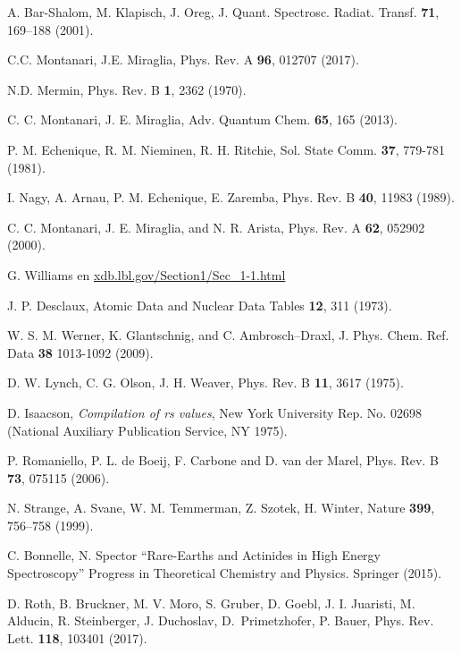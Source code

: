 \begin{thebibliography}{9}
A. Bar-Shalom, M. Klapisch, J. Oreg,
J. Quant. Spectrosc. Radiat. Transf. \textbf{71}, 169--188 (2001).

C.C. Montanari, J.E. Miraglia, 
Phys. Rev. A \textbf{96}, 012707 (2017).

N.D. Mermin, 
Phys. Rev. B \textbf{1}, 2362 (1970).

C. C. Montanari, J. E. Miraglia,
Adv. Quantum Chem. \textbf{65}, 165 (2013).

P. M. Echenique, R. M. Nieminen, R. H. Ritchie, 
Sol. State Comm. \textbf{37}, 779-781 (1981).

I. Nagy, A. Arnau, P. M. Echenique, E. Zaremba, 
Phys. Rev. B \textbf{40}, 11983 (1989).

C. C. Montanari, J. E. Miraglia, and N. R. Arista, 
Phys. Rev. A \textbf{62}, 052902 (2000).

G. Williams en 
\href{http://xdb.lbl.gov/Section1/Sec\_1-1.html}
{xdb.lbl.gov/Section1/Sec\_1-1.html}

J. P. Desclaux,
Atomic Data and Nuclear Data Tables \textbf{12}, 311 (1973).

W. S. M. Werner, K. Glantschnig, and C. Ambrosch--Draxl,
J. Phys. Chem. Ref. Data \textbf{38} 1013-1092 (2009).

D. W. Lynch, C. G. Olson, J. H. Weaver,
Phys. Rev. B \textbf{11}, 3617 (1975).

D. Isaacson,
\textit{Compilation of rs values}, New York University Rep. No. 02698
(National Auxiliary Publication Service, NY 1975).

P. Romaniello, P. L. de Boeij, F. Carbone and D. van der Marel,
Phys. Rev. B \textbf{73}, 075115 (2006).

N. Strange, A. Svane, W. M. Temmerman, Z. Szotek, H. Winter,
Nature \textbf{399}, 756--758 (1999).

C. Bonnelle, N. Spector
``Rare-Earths and Actinides in High Energy Spectroscopy'' 
Progress in Theoretical Chemistry and Physics. Springer (2015).

D. Roth, B. Bruckner, M. V. Moro, S. Gruber, D. Goebl, J. I. Juaristi,
M. Alducin, R. Steinberger, J. Duchoslav, \mbox{D. Primetzhofer}, 
P. Bauer,
Phys. Rev. Lett. \textbf{118}, 103401 (2017).


\end{thebibliography}
